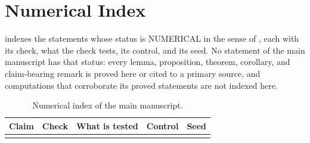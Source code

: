 \chapter{Numerical Index}
\label{app:numerical-provenance}

 indexes the statements whose status is NUMERICAL in the sense of
, each with its check, what the check tests, its control, and its seed. No
statement of the main manuscript has that status: every lemma, proposition, theorem, corollary, and
claim-bearing remark is proved here or cited to a primary source, and computations that corroborate
its proved statements are not indexed here.

{\footnotesize
\renewcommand{\arraystretch}{1.12}
\begin{longtable}{@{}>{\raggedright\arraybackslash}p{}
>{\raggedright\arraybackslash}p{}
>{\raggedright\arraybackslash}p{}
>{\raggedright\arraybackslash}p{}
>{\raggedright\arraybackslash}p{}@{}}
\caption{Numerical index of the main manuscript.}
\label{tab:numerical-index}\\
\toprule
\textbf{Claim} & \textbf{Check} & \textbf{What is tested} & \textbf{Control} & \textbf{Seed} \\
\midrule
\endfirsthead
\bottomrule
\endlastfoot
\multicolumn{5}{@{}l}{No statement of the main manuscript has the status NUMERICAL.} \\
\end{longtable}
}
